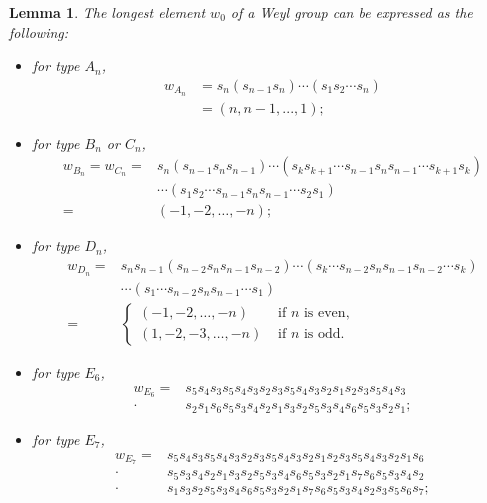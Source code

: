 \documentclass[11pt, reqno]{amsart}
\newtheorem{lem}[Thm]{Lemma}
\theoremstyle{definition}
\numberwithin{equation}{section}
\begin{document}
\begin{lem}\label{long}
    The longest element $w_0$ of a Weyl group can be expressed as the following:
    \begin{itemize}
        \item for type $A_n$,
        \begin{align*}
            w_{A_{n}}&=s_n(s_{n-1}s_n)\cdots (s_1s_2\cdots s_n)\\
            &=(n,n-1,...,1);
        \end{align*}
        \item for type $B_n$ or $C_n$,
        \begin{align*}
w_{B_{n}}=w_{C_{n}}=&s_n(s_{n-1}s_ns_{n-1})\cdots (s_ks_{k+1}\cdots s_{n-1} s_ns_{n-1}\cdots s_{k+1}s_k)\\
&\cdots (s_1s_2\cdots s_{n-1} s_ns_{n-1}\cdots s_2s_1)\\
=&(-1,-2,\dots,-n);
        \end{align*}
        
       
        \item for type $D_n$, 
        \begin{align*}
w_{D_{n}}=& s_ns_{n-1}(s_{n-2}s_ns_{n-1}s_{n-2})\cdots(s_k\cdots s_{n-2}s_ns_{n-1}s_{n-2}\cdots s_k)\\
&\cdots(s_1\cdots s_{n-2}s_n s_{n-1}\cdots s_{1})\\
=&\begin{cases}
    (-1,-2,\dots,-n) & \text{~if~$n$~is~even},\\
    (1,-2,-3,\dots,-n) &\text{~if~$n$~is~odd}.
\end{cases}
        \end{align*}
   
        \item for type $E_6$,
        \begin{align*}
 w_{E_{6}}=&s_5s_{4}s_{3}s_5s_{4}s_{3}s_2 s_{3}s_5s_{4}s_{3} s_2s_1s_2 s_{3}s_5s_{4}s_3 \\
 \cdot &
s_2s_{1}s_6s_5s_3s_4s_2s_1s_3s_2s_5s_3s_4s_6s_5s_3s_2s_1;
        \end{align*}
     \item for type $E_7$,
     \begin{align*}
w_{E_{7}}
=&s_5s_{4}s_{3}s_5s_{4}s_{3}s_2 s_{3}s_5s_{4}s_{3} s_2s_1s_2 s_{3}s_5s_{4}s_3 
s_2s_{1}s_6\\
 \cdot & s_5s_3s_4s_2s_1s_3s_2s_5s_3s_4s_6s_5s_3s_2s_1 s_7s_6s_5s_3s_4s_2\\
 \cdot & s_1s_3s_2s_5s_3s_4s_6s_5s_3s_2s_1s_7s_6s_5s_3s_4s_2s_3s_5s_6s_7;
        \end{align*}
        

\end{itemize}
\end{lem}
\end{document}
